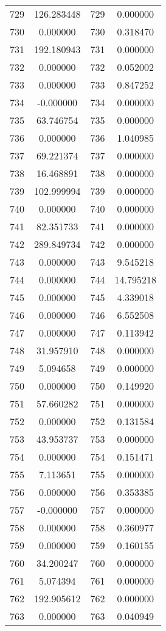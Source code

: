 \documentclass[12pt]{article}
\begin{document}
\begin{longtable}{@{}cccc@{}}
729 & 126.283448 & 729 & 0.000000 \\
730 & 0.000000 & 730 & 0.318470 \\
731 & 192.180943 & 731 & 0.000000 \\
732 & 0.000000 & 732 & 0.052002 \\
733 & 0.000000 & 733 & 0.847252 \\
734 & -0.000000 & 734 & 0.000000 \\
735 & 63.746754 & 735 & 0.000000 \\
736 & 0.000000 & 736 & 1.040985 \\
737 & 69.221374 & 737 & 0.000000 \\
738 & 16.468891 & 738 & 0.000000 \\
739 & 102.999994 & 739 & 0.000000 \\
740 & 0.000000 & 740 & 0.000000 \\
741 & 82.351733 & 741 & 0.000000 \\
742 & 289.849734 & 742 & 0.000000 \\
743 & 0.000000 & 743 & 9.545218 \\
744 & 0.000000 & 744 & 14.795218 \\
745 & 0.000000 & 745 & 4.339018 \\
746 & 0.000000 & 746 & 6.552508 \\
747 & 0.000000 & 747 & 0.113942 \\
748 & 31.957910 & 748 & 0.000000 \\
749 & 5.094658 & 749 & 0.000000 \\
750 & 0.000000 & 750 & 0.149920 \\
751 & 57.660282 & 751 & 0.000000 \\
752 & 0.000000 & 752 & 0.131584 \\
753 & 43.953737 & 753 & 0.000000 \\
754 & 0.000000 & 754 & 0.151471 \\
755 & 7.113651 & 755 & 0.000000 \\
756 & 0.000000 & 756 & 0.353385 \\
757 & -0.000000 & 757 & 0.000000 \\
758 & 0.000000 & 758 & 0.360977 \\
759 & 0.000000 & 759 & 0.160155 \\
760 & 34.200247 & 760 & 0.000000 \\
761 & 5.074394 & 761 & 0.000000 \\
762 & 192.905612 & 762 & 0.000000 \\
763 & 0.000000 & 763 & 0.040949 \\

\end{longtable}
\end{document}
